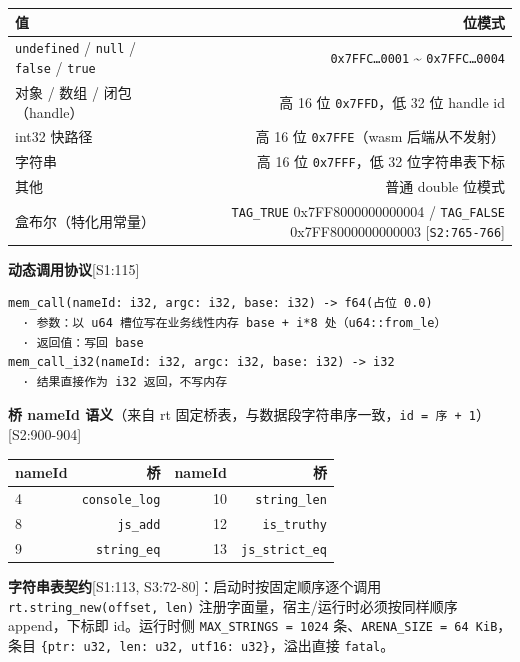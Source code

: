 \documentclass[11pt, a4paper]{article}
\begin{document}
\begin{center}\small\begin{tabular}{lr}
\toprule
值 & 位模式 \\
\midrule
\texttt{undefined} / \texttt{null} / \texttt{false} / \texttt{true} & \texttt{0x7FFC…0001} \textasciitilde{} \texttt{0x7FFC…0004} \\
对象 / 数组 / 闭包（handle） & 高 16 位 \texttt{0x7FFD}，低 32 位 handle id \\
int32 快路径 & 高 16 位 \texttt{0x7FFE}（wasm 后端从不发射） \\
字符串 & 高 16 位 \texttt{0x7FFF}，低 32 位字符串表下标 \\
其他 & 普通 double 位模式 \\
盒布尔（特化用常量） & \texttt{TAG\_TRUE} 0x7FF8000000000004 / \texttt{TAG\_FALSE} 0x7FF8000000000003 [\texttt{S2:765-766}] \\
\bottomrule
\end{tabular}\end{center}


\textbf{动态调用协议}[S1:115]


\begin{verbatim}
mem_call(nameId: i32, argc: i32, base: i32) -> f64(占位 0.0)
  · 参数：以 u64 槽位写在业务线性内存 base + i*8 处（u64::from_le）
  · 返回值：写回 base
mem_call_i32(nameId: i32, argc: i32, base: i32) -> i32
  · 结果直接作为 i32 返回，不写内存
\end{verbatim}

\textbf{桥 nameId 语义}（来自 rt 固定桥表，与数据段字符串序一致，\texttt{id = 序 + 1}）[S2:900-904]


\begin{center}\small\begin{tabular}{lrrr}
\toprule
nameId & 桥 & nameId & 桥 \\
\midrule
4 & \texttt{console\_log} & 10 & \texttt{string\_len} \\
8 & \texttt{js\_add} & 12 & \texttt{is\_truthy} \\
9 & \texttt{string\_eq} & 13 & \texttt{js\_strict\_eq} \\
\bottomrule
\end{tabular}\end{center}


\textbf{字符串表契约}[S1:113, S3:72-80]：启动时按固定顺序逐个调用 \texttt{rt.string\_new(offset, len)} 注册字面量，宿主/运行时必须按同样顺序 append，下标即 id。运行时侧 \texttt{MAX\_STRINGS = 1024} 条、\texttt{ARENA\_SIZE = 64 KiB}，条目 \texttt{\{ptr: u32, len: u32, utf16: u32\}}，溢出直接 \texttt{fatal}。
\end{document}
